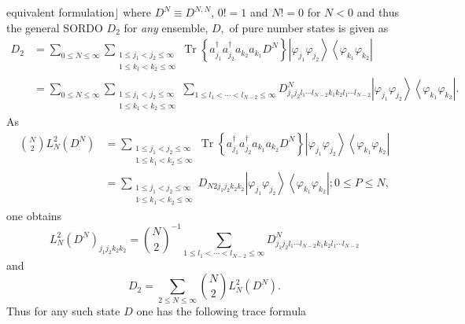 \documentclass[aps,preprint]{revtex4}%
\begin{document}
equivalent formulation$\rfloor$ where $D^{N}\equiv D^{N,N}$, $0!=1$ and $N!=0$
for $N<0$ and thus the general SORDO $D_{2}$ for \emph{any }ensemble, $D,$ of
pure number states is given as
\begin{align}
D_{2}  &  =\sum_{0\leq N\leq\infty}\sum_{\substack{1\leq j_{1}<j_{2}\leq
\infty\\1\leq k_{1}<k_{2}\leq\infty}}\operatorname{Tr}\left\{  a_{j_{1}%
}^{\dagger}a_{j_{2}}^{\dagger}a_{k_{2}}a_{k_{1}}D^{N}\right\}  \left\vert
\varphi_{j_{1}}\varphi_{j_{2}}\right\rangle \left\langle \varphi_{k_{1}%
}\varphi_{k_{2}}\right\vert \nonumber\\
&  =\sum_{0\leq N\leq\infty}\sum_{\substack{1\leq j_{1}<j_{2}\leq\infty\\1\leq
k_{1}<k_{2}\leq\infty}}\sum_{1\leq l_{1}<\cdots<l_{N-2}\leq\infty}%
D_{j_{1}j_{2}l_{1}\cdots l_{N-2}k_{1}k_{2}l_{1}\cdots l_{N-2}}^{N}\left\vert
\varphi_{j_{1}}\varphi_{j_{2}}\right\rangle \left\langle \varphi_{k_{1}%
}\varphi_{k_{2}}\right\vert .
\end{align}
As%
\begin{align}
\binom{N}{2}L_{N}^{2}\left(  D^{N}\right)   &  =\sum_{\substack{1\leq
j_{1}<j_{2}\leq\infty\\1\leq k_{1}<k_{2}\leq\infty}}\operatorname{Tr}\left\{
a_{j_{1}}^{\dagger}a_{j_{2}}^{\dagger}a_{k_{1}}a_{k_{2}}D^{N}\right\}
\left\vert \varphi_{j_{1}}\varphi_{j_{2}}\right\rangle \left\langle
\varphi_{k_{1}}\varphi_{k_{2}}\right\vert \nonumber\\
&  =\sum_{\substack{1\leq j_{1}<j_{2}\leq\infty\\1\leq k_{1}<k_{2}\leq\infty
}}D_{N2j_{1}j_{2}k_{2}k_{2}}\left\vert \varphi_{j_{1}}\varphi_{j_{2}%
}\right\rangle \left\langle \varphi_{k_{1}}\varphi_{k_{2}}\right\vert ;0\leq
P\leq N,
\end{align}
one obtains%
\begin{equation}
L_{N}^{2}\left(  D^{N}\right)  _{j_{1}j_{2}k_{2}k_{2}}=\binom{N}{2}^{-1}%
\sum_{1\leq l_{1}<\cdots<l_{N-2}\leq\infty}D_{j_{1}j_{2}l_{1}\cdots
l_{N-2}k_{1}k_{2}l_{1}\cdots l_{N-2}}^{N}%
\end{equation}
and%
\begin{equation}
D_{2}=\sum_{2\leq N\leq\infty}\binom{N}{2}L_{N}^{2}\left(  D^{N}\right)  .
\end{equation}
Thus for any such state $D$ one has the following trace formula%
\end{document}

